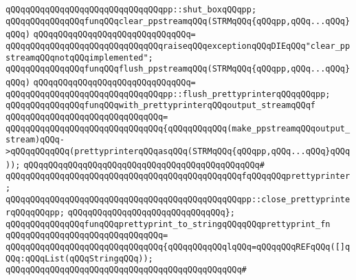 \verb|qQQqqQQqqQQqqQQqqQQqqQQqqQQqqQQqpp::shut_boxqQQqpp;|\newline
\newline
\newline
\verb|qQQqqQQqqQQqqQQqfunqQQqclear_ppstreamqQQq(STRMqQQq{qQQqpp,qQQq...qQQq}qQQq)|\newline
\verb|qQQqqQQqqQQqqQQqqQQqqQQqqQQqqQQq=|\newline
\verb|qQQqqQQqqQQqqQQqqQQqqQQqqQQqqQQqraiseqQQqexceptionqQQqDIEqQQq"clear_ppstreamqQQqnotqQQqimplemented";|\newline
\newline
\newline
\verb|qQQqqQQqqQQqqQQqfunqQQqflush_ppstreamqQQq(STRMqQQq{qQQqpp,qQQq...qQQq}qQQq)|\newline
\verb|qQQqqQQqqQQqqQQqqQQqqQQqqQQqqQQq=|\newline
\verb|qQQqqQQqqQQqqQQqqQQqqQQqqQQqqQQqpp::flush_prettyprinterqQQqqQQqpp;|\newline
\newline
\newline
\verb|qQQqqQQqqQQqqQQqfunqQQqwith_prettyprinterqQQqoutput_streamqQQqf|\newline
\verb|qQQqqQQqqQQqqQQqqQQqqQQqqQQqqQQq=|\newline
\verb|qQQqqQQqqQQqqQQqqQQqqQQqqQQqqQQq{qQQqqQQqqQQq(make_ppstreamqQQqoutput_stream)qQQq->qQQqqQQqqQQq(prettyprinterqQQqasqQQq(STRMqQQq{qQQqpp,qQQq...qQQq}qQQq));|\newline
\verb|qQQqqQQqqQQqqQQqqQQqqQQqqQQqqQQqqQQqqQQqqQQqqQQq#|\newline
\verb|qQQqqQQqqQQqqQQqqQQqqQQqqQQqqQQqqQQqqQQqqQQqqQQqfqQQqqQQqprettyprinter;|\newline
\newline
\verb|qQQqqQQqqQQqqQQqqQQqqQQqqQQqqQQqqQQqqQQqqQQqqQQqpp::close_prettyprinterqQQqqQQqpp;|\newline
\verb|qQQqqQQqqQQqqQQqqQQqqQQqqQQqqQQq};|\newline
\newline
\newline
\verb|qQQqqQQqqQQqqQQqfunqQQqprettyprint_to_stringqQQqqQQqprettyprint_fn|\newline
\verb|qQQqqQQqqQQqqQQqqQQqqQQqqQQqqQQq=|\newline
\verb|qQQqqQQqqQQqqQQqqQQqqQQqqQQqqQQq{qQQqqQQqqQQqlqQQq=qQQqqQQqREFqQQq([]qQQq:qQQqList(qQQqStringqQQq));|\newline
\verb|qQQqqQQqqQQqqQQqqQQqqQQqqQQqqQQqqQQqqQQqqQQqqQQq#|\newline
